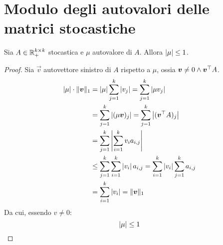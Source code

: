 %
%
%
%


\section{Modulo degli autovalori delle matrici stocastiche}

\begin{thm}
	Sia $A\in\mathbb R_+^{k\times k}$ stocastica e $\mu$ autovalore di $A$. Allora $\left|\mu\right|\le 1$.
\end{thm}
\begin{proof}
	Sia $\vec{v}$ autovettore sinistro di $A$ rispetto a $\mu$, ossia $\bm{v}\ne0\land \bm{v}^\top A$.
	\begin{align*}
		\left|\mu\right|\cdot\|\bm{v}\|_1 & = \left|\mu\right|\sum_{j=1}^k\left|v_j\right| = \sum_{j=1}^k\left|\mu v_j\right|                                 \\
		                       & = \sum_{j=1}^k\left|(\mu \bm{v})_j\right| = \sum_{j=1}^k\left|(\bm{v}^\top A)_j\right|                               \\
		                       & = \sum_{j=1}^k\left|\sum_{i=1}^k v_i a_{i,j}\right|                                                 \\
		                       & \le \sum_{j=1}^k \sum_{i=1}^k \left|v_i\right| a_{i,j} = \sum_{i=1}^k \left|v_i\right| \sum_{j=1}^k a_{i,j} \\
		                       & = \sum_{i=1}^k \left|v_i\right| = \|\bm{v}\|_1
	\end{align*}
	Da cui, essendo $v\neq 0$:
	\begin{equation*}
		\left|\mu\right|\leq 1 \qedhere
	\end{equation*}
\end{proof}
